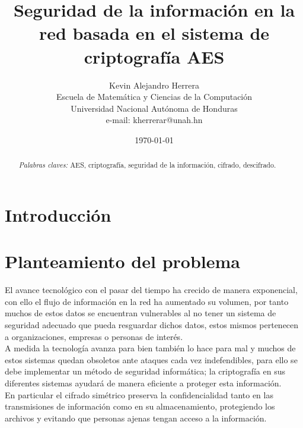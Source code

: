 \documentclass[peerreview]{IEEEtran}
\begin{document}
\title{Seguridad de la información en la red basada en el sistema de
  criptografía AES}

\author{Kevin Alejandro Herrera\\
  Escuela de Matemática y Ciencias de la Computación\\
  Universidad Nacional Aut\'onoma de Honduras\\
  e-mail: kherrerar@unah.hn
}
\date{\today}

\maketitle
\tableofcontents
\listoffigures
\listoftables

\IEEEpeerreviewmaketitle{}
\begin{abstract}
  
  \bigbreak{}
  \textit{Palabras claves:} AES, criptografía, seguridad de la información,
  cifrado, descifrado.
\end{abstract}

\section{Introducci\'on}


\section{Planteamiento del problema}
El avance tecnológico con el pasar del tiempo ha crecido de manera
exponencial, con ello el flujo de información en la red ha aumentado su
volumen, por tanto muchos de estos datos se encuentran vulnerables al no tener
un sistema de seguridad adecuado que pueda resguardar dichos datos, estos
mismos pertenecen a organizaciones, empresas o personas de interés.\\

A medida la tecnología avanza para bien también lo hace para mal y muchos de
estos sistemas quedan obsoletos ante ataques cada vez indefendibles, para ello
se debe implementar un método de seguridad informática; la criptografía en sus
diferentes sistemas ayudará de manera eficiente a proteger esta información.\\

En particular el cifrado simétrico preserva la confidencialidad tanto en las
transmisiones de información como en su almacenamiento, protegiendo los
archivos y evitando que personas ajenas tengan acceso a la información.
\end{document}
